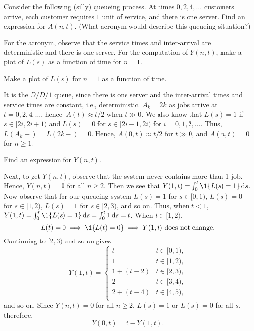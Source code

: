  \begin{exercise}  
Consider the following (silly) queueing process.
 At times $0, 2,4, \ldots$ customers arrive, each customer requires $1$ unit of service, and there is one server.
 Find an expression for $A(n,t)$.
 (What acronym would describe this queueing situation?)
\begin{hint}
 For the acronym, observe that the service times and inter-arrival are deterministic and there is one server.
 For the computation of $Y(n,t)$, make a plot of $L(s)$ as a function of time for $n=1$.

 Make a plot of $L(s)$ for $n=1$ as a function of time.
\end{hint}
\begin{solution}
 It is the $D/D/1$ queue, since there is one server and the inter-arrival times and service times are constant, i.e., deterministic.
 $A_k = 2k$ as jobs arrive at $t=0, 2, 4, \ldots$, hence, $A(t) \approx t/2$ when $t\gg 0$.
 We also know that $L(s)=1$ if $s\in [2i, 2i+1)$ and $L(s)=0$ for $s\in[2i-1, 2i)$ for $i=0, 1, 2, \ldots$.
 Thus, $L(A_k-) = L(2k-)=0$.
 Hence, $A(0,t) \approx t/2$ for $t\gg 0$, and $A(n,t)=0$ for $n\geq 1$.
\end{solution}
\end{exercise}


\begin{exercise}  
 Find an expression for $Y(n,t)$.
\begin{solution}
 Next, to get $Y(n,t)$, observe that the system never contains
 more than 1 job. Hence, $Y(n,t)=0$ for all $n\geq 2$. Then we see that
 $Y(1,t) = \int_0^t \1{L(s) = 1}\d s.$ Now observe that for our
 queueing system $L(s)=1$ for $s\in[0,1)$, $L(s)=0$ for
 $s\in[1,2)$, $L(s)=1$ for $s\in[2,3)$, and so on. Thus, when
 $t<1$, $Y(1,t)=\int_0^t \1{L(s)=1} \d s = \int_0^t 1\d s = t$.
 When $t\in[1,2)$, 
 \begin{equation*}
 L(t)=0 \implies \1{L(t)=0} \implies Y(1,t) \text{ does not change}.
 \end{equation*}
Continuing to $[2,3)$ and so on gives
 \begin{equation*}
 Y(1,t) =
 \begin{cases}
 t & t\in[0,1), \\
 1 & t\in[1,2), \\
 1+(t-2) & t\in[2,3), \\
 2 & t\in[3,4), \\
 2+(t-4) & t\in[4,5), \\
 \end{cases}
 \end{equation*}
 and so on. Since $Y(n,t)=0$ for all $n\geq 2$, $L(s) = 1$ or
 $L(s)=0$ for all $s$, therefore, 
 \begin{equation*}
 Y(0,t) = t-Y(1,t).
 \end{equation*}
\end{solution}
\end{exercise}


